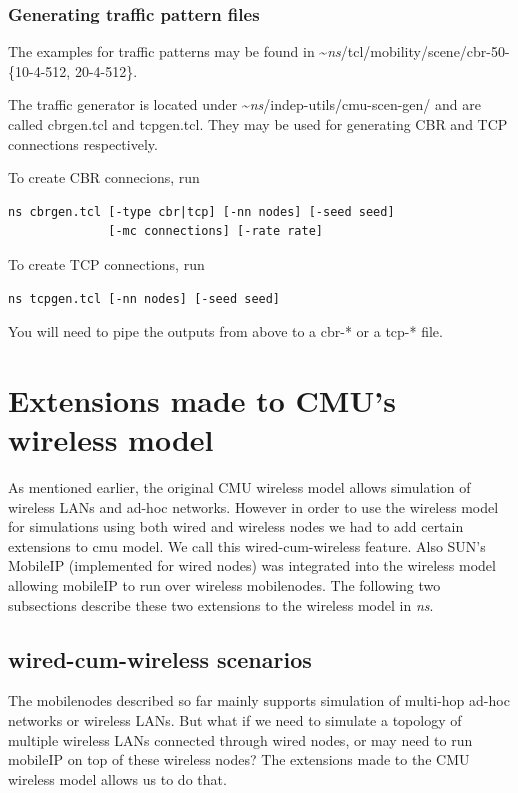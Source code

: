 \subsubsection{Generating traffic pattern files}
\label{sec:mobile-traffic-file}

The examples for traffic patterns may be found in
\textasciitilde\emph{ns}/{tcl/mobility/scene/cbr-50-\{10-4-512, 20-4-512\}}.

The traffic generator is located under \textasciitilde\emph{ns}/{indep-utils/cmu-scen-gen/}
and are called cbrgen.tcl and tcpgen.tcl. They may be used for
generating CBR and TCP connections respectively.

To create CBR connecions, run
\begin{verbatim}
ns cbrgen.tcl [-type cbr|tcp] [-nn nodes] [-seed seed] 
              [-mc connections] [-rate rate]
\end{verbatim}
To create TCP connections, run
\begin{verbatim}
ns tcpgen.tcl [-nn nodes] [-seed seed]
\end{verbatim}
You will need to pipe the outputs from above to a cbr-* or a tcp-* file.


\section{Extensions made to CMU's wireless model}
\label{sec:wireless-extensions}

As mentioned earlier, the original CMU wireless model allows
simulation of wireless LANs and ad-hoc networks. However in order to
use the wireless model for simulations using both wired and wireless
nodes we had to add certain extensions to cmu model. We 
call this wired-cum-wireless feature. Also SUN's MobileIP (implemented
for wired nodes) was integrated into the wireless model allowing
mobileIP to run over wireless mobilenodes. The following two
subsections describe these two extensions to the wireless 
model in \emph{ns}. 


\subsection{wired-cum-wireless scenarios}
\label{sec:wired-cum-wireless}

The mobilenodes described so far mainly supports simulation of
multi-hop ad-hoc networks or wireless LANs. But what if we need to
simulate a topology of multiple wireless LANs connected through wired
nodes, or may need to run mobileIP on top of these wireless nodes? The
extensions made to the CMU wireless model allows us to do that. 

